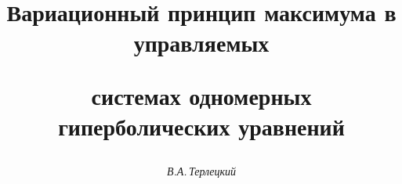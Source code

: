 




% 





\newcommand{\la}{\langle}


\newcommand{\ra}{\rangle}


\newcommand{\const}{\operatorname{const}}


\newcommand{\tts}[1]{}


\renewcommand{\P}{{\mathrm{P}}}









\setcounter{page}{82}















\author{\it В.А.\,Терлецкий }




\title{Вариационный принцип максимума в управляемых


системах одномерных гиперболических уравнений}


\date{}







\pagestyle{plain} %







